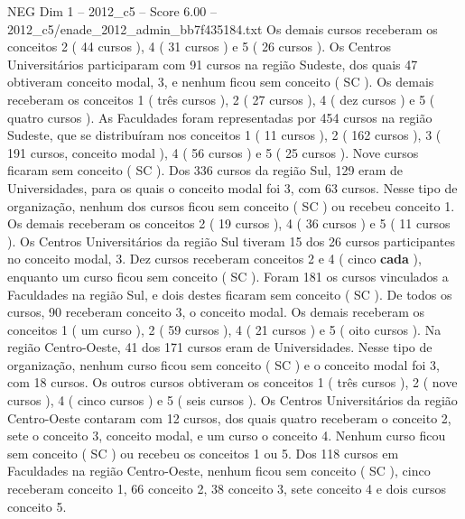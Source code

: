 \begin{textsample}{NEG Dim 1 – 2012\_c5 – Score 6.00 – 2012\_c5/enade\_2012\_admin\_bb7f435184.txt}
Os demais cursos receberam os conceitos 2 ( 44 cursos ), 4 ( 31 cursos ) e 5 ( 26 cursos ).
Os Centros Universitários participaram com 91 cursos na região Sudeste, dos quais 47 obtiveram conceito modal, 3, e nenhum ficou sem conceito ( SC ).
Os demais receberam os conceitos 1 ( três cursos ), 2 ( 27 cursos ), 4 ( dez cursos ) e 5 ( quatro cursos ).
As Faculdades foram representadas por 454 cursos na região Sudeste, que se distribuíram nos conceitos 1 ( 11 cursos ), 2 ( 162 cursos ), 3 ( 191 cursos, conceito modal ), 4 ( 56 cursos ) e 5 ( 25 cursos ).
Nove cursos ficaram sem conceito ( SC ).
Dos 336 cursos da região Sul, 129 eram de Universidades, para os quais o conceito modal foi 3, com 63 cursos.
Nesse tipo de organização, nenhum dos cursos ficou sem conceito ( SC ) ou recebeu conceito 1.
Os demais receberam os conceitos 2 ( 19 cursos ), 4 ( 36 cursos ) e 5 ( 11 cursos ).
Os Centros Universitários da região Sul tiveram 15 dos 26 cursos participantes no conceito modal, 3.
Dez cursos receberam conceitos 2 e 4 ( cinco \textbf{cada} ), enquanto um curso ficou sem conceito ( SC ).
Foram 181 os cursos vinculados a Faculdades na região Sul, e dois destes ficaram sem conceito ( SC ).
De todos os cursos, 90 receberam conceito 3, o conceito modal.
Os demais receberam os conceitos 1 ( um curso ), 2 ( 59 cursos ), 4 ( 21 cursos ) e 5 ( oito cursos ).
Na região Centro-Oeste, 41 dos 171 cursos eram de Universidades.
Nesse tipo de organização, nenhum curso ficou sem conceito ( SC ) e o conceito modal foi 3, com 18 cursos.
Os outros cursos obtiveram os conceitos 1 ( três cursos ), 2 ( nove cursos ), 4 ( cinco cursos ) e 5 ( seis cursos ).
Os Centros Universitários da região Centro-Oeste contaram com 12 cursos, dos quais quatro receberam o conceito 2, sete o conceito 3, conceito modal, e um curso o conceito 4.
Nenhum curso ficou sem conceito ( SC ) ou recebeu os conceitos 1 ou 5.
Dos 118 cursos em Faculdades na região Centro-Oeste, nenhum ficou sem conceito ( SC ), cinco receberam conceito 1, 66 conceito 2, 38 conceito 3, sete conceito 4 e dois cursos conceito 5.

\end{textsample}
